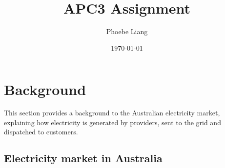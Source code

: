 \documentclass[12pt]{article}
\title{APC3 Assignment}
\author{Phoebe Liang}
\date{\today}
\begin{document}
\maketitle

\tableofcontents
\clearpage

\section{Background}
\begin{flushleft}
This section provides a background to the Australian electricity market, explaining how electricity
is generated by providers, sent to the grid and dispatched to customers.
\end{flushleft}
\subsection{Electricity market in Australia}
\end{document}
